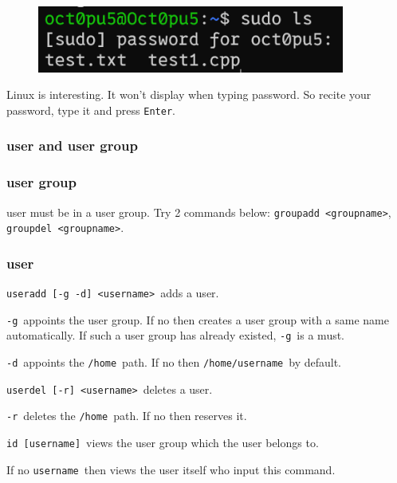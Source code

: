 \documentclass[12pt]{ctexart}
\begin{document}
\begin{figure}[H]
    \centering
    \includegraphics[width=0.9\textwidth,keepaspectratio]{assets/Linux/1.6 Linux user and permission commands/1.png}
\end{figure}

Linux is interesting. It won't display when typing
password. So recite your password, type it and press \texttt{Enter}.

\subsubsection{\textbf{user and user group}}

\subsubsection*{\textbf{user group}}

user must be in a user group. Try 2 commands below:
\texttt{groupadd\ \textless{}groupname\textgreater{}},
\texttt{groupdel\ \textless{}groupname\textgreater{}}.

\subsubsection*{\textbf{user}}

\texttt{useradd\ {[}-g\ -d{]}\ \textless{}username\textgreater{}}\ adds a
user.

\texttt{-g}\ appoints the user group. If no then creates a user group
with a same name automatically. If such a user group has already
existed, \texttt{-g}\ is a must.

\texttt{-d}\ appoints the \texttt{/home}\ path. If no then
\texttt{/home/username}\ by default.

\texttt{userdel\ {[}-r{]}\ \textless{}username\textgreater{}}\ deletes a
user.

\texttt{-r}\ deletes the \texttt{/home}\ path. If no then reserves it.

\texttt{id\ {[}username{]}}\ views the user group which the user belongs
to.

If no \texttt{username}\ then views the user itself who input this
command.
\end{document}
